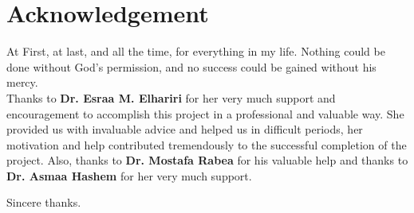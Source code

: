 \chapter*{Acknowledgement}


At First, at last, and all the time, for everything in my life. 
Nothing could be done without God's permission, and no success
could be gained without his mercy. \\
Thanks to \textbf{Dr. Esraa M. Elhariri} for her very much support 
and encouragement to accomplish this project in a professional 
and valuable way. She provided us with invaluable advice and helped us 
in difficult periods, her motivation and help contributed tremendously 
to the successful completion of the project. Also, thanks to 
\textbf{Dr. Mostafa Rabea} for his valuable help and thanks 
to \textbf{Dr. Asmaa Hashem} for her very much support.

\begin{flushright}
Sincere thanks.
\end{flushright}


